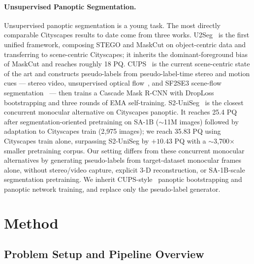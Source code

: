 \documentclass[10pt,twocolumn,letterpaper]{article}
\begin{document}
\paragraph{Unsupervised Panoptic Segmentation.}
Unsupervised panoptic segmentation is a young task. The most directly comparable Cityscapes results to date come from three works. U2Seg~\cite{niu2024u2seg} is the first unified framework, composing STEGO and MaskCut on object-centric data and transferring to scene-centric Cityscapes; it inherits the dominant-foreground bias of MaskCut and reaches roughly 18 PQ. CUPS~\cite{hahn2025cups} is the current scene-centric state of the art and constructs pseudo-labels from pseudo-label-time stereo and motion cues --- stereo video, unsupervised optical flow~\cite{stone2021smurf}, and SF2SE3 scene-flow segmentation~\cite{sommer2022sf2se3} --- then trains a Cascade Mask R-CNN with DropLoss bootstrapping and three rounds of EMA self-training. S2-UniSeg~\cite{xu2025s2uniseg} is the closest concurrent monocular alternative on Cityscapes panoptic. It reaches 25.4 PQ after segmentation-oriented pretraining on SA-1B ($\sim$11M images) followed by adaptation to Cityscapes train (2{,}975 images); we reach 35.83 PQ using Cityscapes train alone, surpassing S2-UniSeg by $+10.43$ PQ with a $\sim$3{,}700$\times$ smaller pretraining corpus. Our setting differs from these concurrent monocular alternatives by generating pseudo-labels from target-dataset monocular frames alone, without stereo/video capture, explicit 3-D reconstruction, or SA-1B-scale segmentation pretraining. We inherit CUPS-style~\cite{hahn2025cups} panoptic bootstrapping and panoptic network training, and replace only the pseudo-label generator.


\section{Method}
\label{sec:method}

\subsection{Problem Setup and Pipeline Overview}
\label{sec:method:setup}
\end{document}
